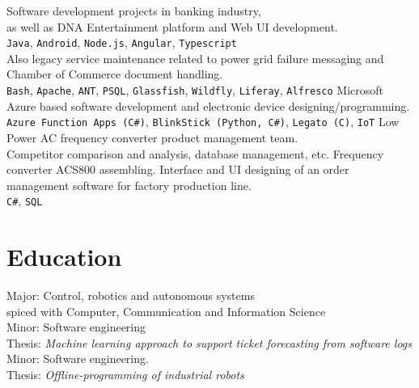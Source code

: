 \documentclass[letterpaper]{twentysecondcv}
\begin{document}
\begin{twenty} %
    {Software development projects in banking industry,\\
    as well as DNA Entertainment platform and Web UI development.\\
     \texttt{Java}, \texttt{Android}, \texttt{Node.js}, \texttt{Angular}, \texttt{Typescript} \\
  Also legacy service maintenance related to power grid failure messaging and Chamber of Commerce document handling.\\
     \texttt{Bash}, \texttt{Apache}, \texttt{ANT}, \texttt{PSQL}, \texttt{Glassfish}, \texttt{Wildfly}, \texttt{Liferay}, \texttt{Alfresco}}
    {Microsoft Azure based software development and electronic device designing/programming.\\
     \texttt{Azure Function Apps (C\#)}, \texttt{BlinkStick (Python, C\#)}, \texttt{Legato (C)}, \texttt{IoT}}
    {Low Power AC frequency converter product management team.\\
    Competitor comparison and analysis, database management, etc.}
    {Frequency converter ACS800 assembling.}
    {Interface and UI designing of an order management software for factory production line. \\
     \texttt{C\#}, \texttt{SQL}
    }
\end{twenty}




\section{Education}

\begin{twenty} %
  {Major: Control, robotics and autonomous systems \\
  spiced with Computer, Communication and Information Science \\
  Minor: Software engineering \\
  Thesis: \emph{Machine learning approach to support ticket forecasting from software logs}}
  {Minor: Software engineering.
  \\Thesis: \emph{Offline-programming of industrial robots}}
\end{twenty}
\end{document}

